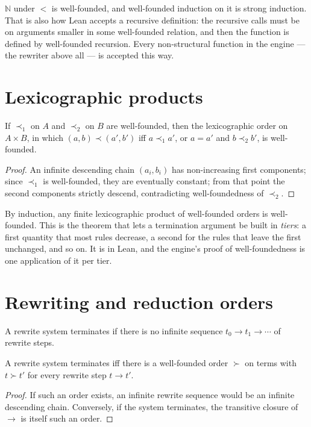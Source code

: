 $\mathbb{N}$ under $<$ is well-founded, and well-founded induction on it is strong induction.
That is also how Lean accepts a recursive definition: the recursive calls must be on arguments
smaller in some well-founded relation, and then the function is defined by well-founded
recursion. Every non-structural function in the engine --- the rewriter above all --- is
accepted this way.

\section{Lexicographic products}

\begin{theorem}
  If $\prec_1$ on $A$ and $\prec_2$ on $B$ are well-founded, then the lexicographic order on
  $A \times B$, in which $(a, b) \prec (a', b')$ iff $a \prec_1 a'$, or $a = a'$ and
  $b \prec_2 b'$, is well-founded.
\end{theorem}
\begin{proof}
  An infinite descending chain $(a_i, b_i)$ has non-increasing first components; since
  $\prec_1$ is well-founded, they are eventually constant; from that point the second components
  strictly descend, contradicting well-foundedness of $\prec_2$.
\end{proof}

By induction, any finite lexicographic product of well-founded orders is well-founded. This is the
theorem that lets a termination argument be built in \emph{tiers}: a first quantity that most
rules decrease, a second for the rules that leave the first unchanged, and so on. It is
 in Lean, and the engine's proof of well-foundedness is one application of it per
tier.

\section{Rewriting and reduction orders}

\begin{definition}
  A rewrite system terminates if there is no infinite sequence $t_0 \to t_1 \to \cdots$ of
  rewrite steps.
\end{definition}

\begin{theorem}
  A rewrite system terminates iff there is a well-founded order $\succ$ on terms with $t \succ t'$
  for every rewrite step $t \to t'$.
\end{theorem}
\begin{proof}
  If such an order exists, an infinite rewrite sequence would be an infinite descending chain.
  Conversely, if the system terminates, the transitive closure of $\to$ is itself such an order.
\end{proof}


